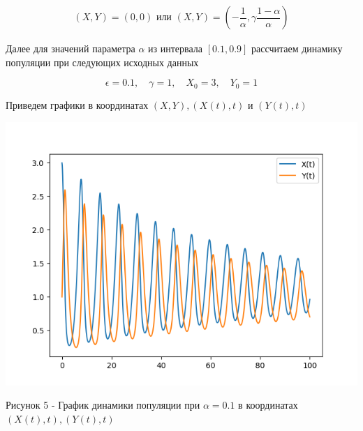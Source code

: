 \documentclass[a4paper,14pt]{extreport}
\begin{document}
\begin{equation*}
    \begin{aligned}
       (X,Y)=(0,0) \text{ или } (X,Y)=(-\dfrac{1}{\alpha},\gamma \dfrac{1-\alpha}{\alpha})
    \end{aligned}
\end{equation*}

Далее для значений параметра $\alpha$ из интервала $[0.1, 0.9]$ рассчитаем динамику популяции при следующих исходных данных

$$
\epsilon=0.1, \quad \gamma=1, \quad X_0=3, \quad Y_0=1
$$

Приведем графики в координатах $(X,Y), (X(t),t)$ и $(Y(t),t)$


\begin{center}
    \begin{minipage}[htb]{0.8\linewidth}
    \includegraphics[width=14cm]{n5.png}
    \end{minipage}
    \end{center}
    \begin{center}
        Рисунок 5 - График динамики популяции при $\alpha = 0.1$ в координатах $(X(t),t),(Y(t),t)$
    \end{center}
\end{document}

